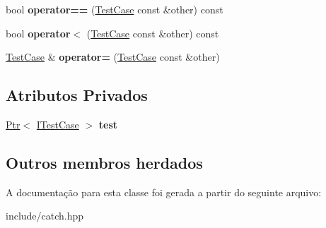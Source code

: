 \begin{DoxyCompactItemize}
\item 
bool {\bfseries operator==} (\hyperlink{classCatch_1_1TestCase}{Test\+Case} const \&other) const \hypertarget{classCatch_1_1TestCase_a40eab521b316c7d476f6b4dd1c33eec8}{}\label{classCatch_1_1TestCase_a40eab521b316c7d476f6b4dd1c33eec8}

\item 
bool {\bfseries operator$<$} (\hyperlink{classCatch_1_1TestCase}{Test\+Case} const \&other) const \hypertarget{classCatch_1_1TestCase_aa5174e85e3aac6e7398dee9c76730324}{}\label{classCatch_1_1TestCase_aa5174e85e3aac6e7398dee9c76730324}

\item 
\hyperlink{classCatch_1_1TestCase}{Test\+Case} \& {\bfseries operator=} (\hyperlink{classCatch_1_1TestCase}{Test\+Case} const \&other)\hypertarget{classCatch_1_1TestCase_a8022e3f74232f7887d2d2cbbc8876502}{}\label{classCatch_1_1TestCase_a8022e3f74232f7887d2d2cbbc8876502}

\end{DoxyCompactItemize}
\subsection*{Atributos Privados}
\begin{DoxyCompactItemize}
\item 
\hyperlink{classCatch_1_1Ptr}{Ptr}$<$ \hyperlink{structCatch_1_1ITestCase}{I\+Test\+Case} $>$ {\bfseries test}\hypertarget{classCatch_1_1TestCase_a555d1f4b91619cfbe9f8f853d574ce40}{}\label{classCatch_1_1TestCase_a555d1f4b91619cfbe9f8f853d574ce40}

\end{DoxyCompactItemize}
\subsection*{Outros membros herdados}


A documentação para esta classe foi gerada a partir do seguinte arquivo\+:\begin{DoxyCompactItemize}
\item 
include/catch.\+hpp\end{DoxyCompactItemize}
